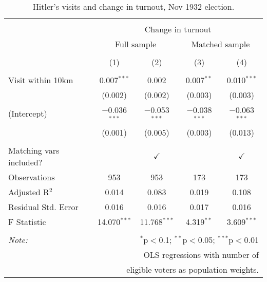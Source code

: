 
\begin{table}[!htbp] \centering 
  \caption{Hitler's visits and change in turnout, Nov 1932 election.} 
  \label{tab:ols-d_p_turnout-3} 
\begin{tabular}{@{\extracolsep{5pt}}lcccc} 
\\[-1.8ex]\hline 
\hline \\[-1.8ex] 
 & \multicolumn{4}{c}{Change in turnout} \\ 
\cline{2-5} 
 & \multicolumn{2}{c}{Full sample} & \multicolumn{2}{c}{Matched sample} \\ 
\\[-1.8ex] & (1) & (2) & (3) & (4)\\ 
\hline \\[-1.8ex] 
 Visit within 10km & 0.007$^{***}$ & 0.002 & 0.007$^{**}$ & 0.010$^{***}$ \\ 
  & (0.002) & (0.002) & (0.003) & (0.003) \\ 
  (Intercept) & $-$0.036$^{***}$ & $-$0.053$^{***}$ & $-$0.038$^{***}$ & $-$0.063$^{***}$ \\ 
  & (0.001) & (0.005) & (0.003) & (0.013) \\ 
 \hline \\[-1.8ex] 
Matching vars included? &  & \multicolumn{1}{c}{$\checkmark$} &  & \multicolumn{1}{c}{$\checkmark$} \\ 
Observations & 953 & 953 & 173 & 173 \\ 
Adjusted R$^{2}$ & 0.014 & 0.083 & 0.019 & 0.108 \\ 
Residual Std. Error & 0.016 & 0.016 & 0.017 & 0.016 \\ 
F Statistic & 14.070$^{***}$ & 11.768$^{***}$ & 4.319$^{**}$ & 3.609$^{***}$ \\ 
\hline 
\hline \\[-1.8ex] 
\textit{Note:}  & \multicolumn{4}{r}{$^{*}$p$<$0.1; $^{**}$p$<$0.05; $^{***}$p$<$0.01} \\ 
 & \multicolumn{4}{r}{OLS regressions with number of} \\ 
 & \multicolumn{4}{r}{eligible voters as population weights.} \\ 
\end{tabular} 
\end{table} 
